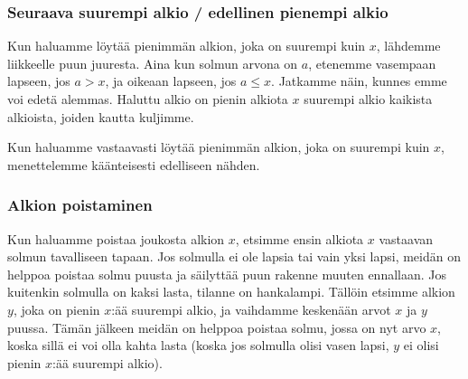\subsubsection{Seuraava suurempi alkio / edellinen pienempi alkio}

Kun haluamme löytää pienimmän alkion,
joka on suurempi kuin $x$,
lähdemme liikkeelle puun juuresta.
Aina kun solmun arvona on $a$,
etenemme vasempaan lapseen,
jos $a>x$, ja oikeaan lapseen, jos $a \le x$.
Jatkamme näin, kunnes emme voi edetä alemmas.
Haluttu alkio on pienin alkiota $x$ suurempi alkio
kaikista alkioista, joiden kautta kuljimme.

Kun haluamme vastaavasti löytää pienimmän alkion,
joka on suurempi kuin $x$,
menettelemme käänteisesti edelliseen nähden.

\subsubsection{Alkion poistaminen}

Kun haluamme poistaa joukosta alkion $x$, etsimme ensin
alkiota $x$ vastaavan solmun tavalliseen tapaan.
Jos solmulla ei ole lapsia tai vain yksi lapsi,
meidän on helppoa poistaa solmu puusta ja säilyttää
puun rakenne muuten ennallaan.
Jos kuitenkin solmulla on kaksi lasta,
tilanne on hankalampi.
Tällöin etsimme alkion $y$,
joka on pienin $x$:ää suurempi alkio,
ja vaihdamme keskenään arvot $x$ ja $y$ puussa.
Tämän jälkeen meidän on helppoa poistaa solmu,
jossa on nyt arvo $x$,
koska sillä ei voi olla kahta lasta
(koska jos solmulla olisi vasen lapsi,
$y$ ei olisi pienin $x$:ää suurempi alkio).

